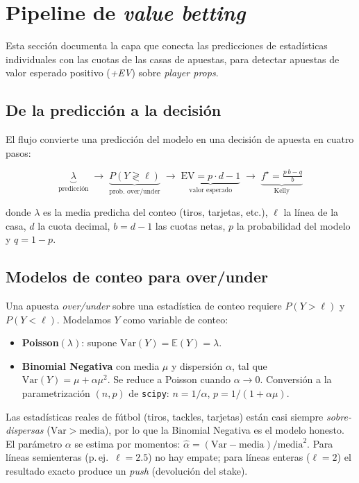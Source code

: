 \section{Pipeline de \emph{value betting}}
\label{sec:betting}

Esta sección documenta la capa que conecta las predicciones de estadísticas
individuales con las cuotas de las casas de apuestas, para detectar apuestas de
valor esperado positivo (\emph{+EV}) sobre \emph{player props}.

\subsection{De la predicción a la decisión}

El flujo convierte una predicción del modelo en una decisión de apuesta en cuatro
pasos:

\[
\underbrace{\lambda}_{\text{predicción}}
\;\longrightarrow\;
\underbrace{P(Y \gtrless \ell)}_{\text{prob.\ over/under}}
\;\longrightarrow\;
\underbrace{\mathrm{EV} = p\cdot d - 1}_{\text{valor esperado}}
\;\longrightarrow\;
\underbrace{f^\star = \tfrac{p\,b - q}{b}}_{\text{Kelly}}
\]

donde $\lambda$ es la media predicha del conteo (tiros, tarjetas, etc.), $\ell$ la
línea de la casa, $d$ la cuota decimal, $b = d-1$ las cuotas netas, $p$ la
probabilidad del modelo y $q = 1-p$.

\subsection{Modelos de conteo para over/under}

Una apuesta \emph{over/under} sobre una estadística de conteo requiere
$P(Y > \ell)$ y $P(Y < \ell)$. Modelamos $Y$ como variable de conteo:

\begin{itemize}[noitemsep]
  \item \textbf{Poisson}$(\lambda)$: supone $\mathrm{Var}(Y) = \mathbb{E}(Y) = \lambda$.
  \item \textbf{Binomial Negativa} con media $\mu$ y dispersión $\alpha$, tal que
  $\mathrm{Var}(Y) = \mu + \alpha\mu^2$. Se reduce a Poisson cuando $\alpha \to 0$.
  Conversión a la parametrización $(n,p)$ de \texttt{scipy}: $n = 1/\alpha$,
  $p = 1/(1+\alpha\mu)$.
\end{itemize}

Las estadísticas reales de fútbol (tiros, tackles, tarjetas) están casi siempre
\emph{sobre-dispersas} ($\mathrm{Var} > \text{media}$), por lo que la Binomial
Negativa es el modelo honesto. El parámetro $\alpha$ se estima por momentos:
$\hat{\alpha} = (\mathrm{Var} - \text{media}) / \text{media}^2$. Para líneas
semienteras (p.\,ej.\ $\ell = 2.5$) no hay empate; para líneas enteras
($\ell = 2$) el resultado exacto produce un \emph{push} (devolución del stake).

